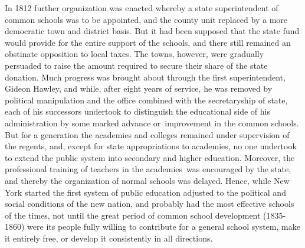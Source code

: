 \documentclass[
]{book}
\begin{document}
In 1812 further organization was enacted whereby a state superintendent of common schools was to be appointed, and the county unit replaced by a more democratic town and district basis. But it had been supposed that the state fund would provide for the entire support of the schools, and there still remained an obstinate opposition to local taxes. The towns, however, were gradually persuaded to raise the amount required to secure their share of the state donation. Much progress was brought about through the first superintendent, Gideon Hawley, and while, after eight years of service, he was removed by political manipulation and the office combined with the secretaryship of state, each of his successors undertook to distinguish the educational side of his administration by some marked advance or~improvement in the common schools. But for a generation the academies and colleges remained under supervision of the regents, and, except for state appropriations to academies, no one undertook to extend the public system into secondary and higher education. Moreover, the professional training of teachers in the academies~was encouraged by the state, and thereby the organization of normal schools was delayed. Hence, while New York started the first system of public education adjusted to the political and social conditions of the new nation, and probably had the most effective schools of the times, not until the great period of common school development (1835-1860) were its people fully willing to contribute for a general school system, make it entirely free, or develop it consistently in all directions.
\end{document}
